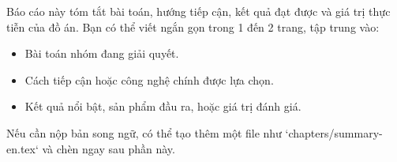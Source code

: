 
Báo cáo này tóm tắt bài toán, hướng tiếp cận, kết quả đạt được và giá trị thực tiễn của đồ án.
Bạn có thể viết ngắn gọn trong 1 đến 2 trang, tập trung vào:

\begin{itemize}
  \item Bài toán nhóm đang giải quyết.
  \item Cách tiếp cận hoặc công nghệ chính được lựa chọn.
  \item Kết quả nổi bật, sản phẩm đầu ra, hoặc giá trị đánh giá.
\end{itemize}

Nếu cần nộp bản song ngữ, có thể tạo thêm một file như `chapters/summary-en.tex`
và chèn ngay sau phần này.
